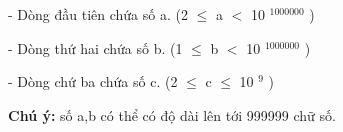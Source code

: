 - Dòng đầu tiên chứa số a. (2  $\le$  a $<$ 10   $^     1000000    $    )   



    - Dòng thứ hai chứa số b. (1  $\le$  b $<$ 10   $^     1000000    $    )   



    - Dòng chứ ba chứa số c. (2 $\le$ c $\le$ 10   $^     9    $    )   



\textbf{     Chú ý:    }    số a,b có thể có độ dài lên tới 999999 chữ số.   

\